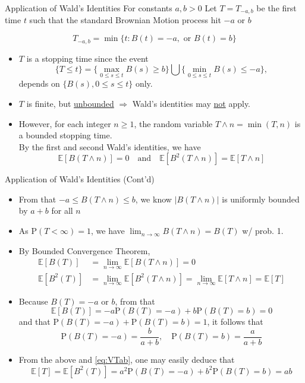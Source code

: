 \documentclass[letterpaper,handout]{beamer}
\def\p{\mathrm P}
\def\E{\mathbb E}
\begin{document}
\begin{frame}{Application of Wald's Identities}
For constants $a,b>0$
Let $T=T_{-a,b}$ be the first time $t$ such that the standard Brownian Motion process hit $-a$ or $b$

$$T_{-a,b}=\min\{t: B(t)=-a,\mbox{ or }B(t)=b\}$$\vspace{-15pt}

\begin{itemize}
\item $T$ is a stopping time since the event
$$\{T\le t\}=\Big\{\max_{0\le s\le t}B(s)\ge b\Big\}\bigcup\Big\{\min_{0\le s\le t}B(s)\le -a\Big\},$$
depends on $\{B(s),0\le s\le t\}$ only.
\item $T$ is finite, but \underline{unbounded} $\Rightarrow$ Wald's identities may \underline{not} apply.
\item However, for each integer $n\ge 1$, the random variable $T\wedge n=\min(T,n)$ is a bounded stopping time.\\
By the first and second Wald's identities, we have
$$
\E[B(T\wedge n)]=0\quad\mbox{and}\quad\E[B^2(T\wedge n)]=\E[T\wedge n]
$$
\end{itemize}
\end{frame}
\begin{frame}{Application of Wald's Identities (Cont'd)}
\begin{itemize}
\item From that $-a\le B(T\wedge n)\le b$, we know $|B(T\wedge n)|$ is uniformly bounded by $a+b$ for all $n$
\item As $\p(T\!<\!\infty)\!=\!1$, we have $\displaystyle\lim_{n\to\infty}B(T\wedge n)=B(T)$ w/ prob. 1.
\item By Bounded Convergence Theorem,
\begin{align}
\E[B(T)]&=\lim_{n\to\infty}\E[B(T\wedge n)]=0\label{eq:ETab}\\
\E[B^2(T)]&=\lim_{n\to\infty}\E[B^2(T\wedge n)]=\lim_{n\to\infty}\E[T\wedge n]=\E[T]\label{eq:VTab}
\end{align}
\item Because $B(T)=-a$ or $b$, from that
$$\E[B(T)]=-a\p(B(T)=-a)+b\p(B(T)=b)=0$$
and that $\p(B(T)=-a)+\p(B(T)=b)=1$, it follows that
$$\p(B(T)=-a)=\frac{b}{a+b},\quad\p(B(T)=b)=\frac{a}{a+b}$$
\item From the above and \eqref{eq:VTab}, one may easily deduce that
$$\E[T]=\E[B^2(T)]=a^2\p(B(T)=-a)+b^2\p(B(T)=b)=ab$$
\end{itemize}
\end{frame}
\end{document}
